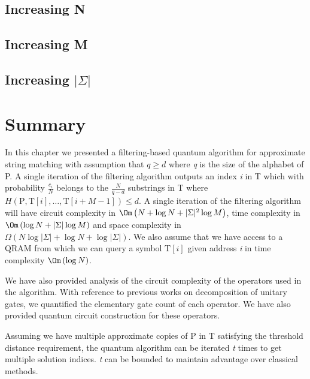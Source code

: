 \subsection{Increasing N}

\subsection{Increasing M}

\subsection{Increasing $\vert\Sigma\vert$}

\section{Summary}
In this chapter we presented a filtering-based quantum algorithm for approximate string matching with assumption that $q \geq d$ where \textit{q} is the size of the alphabet of P. A single iteration of the filtering algorithm outputs an index \textit{i} in T which with probability $\frac{c_i}{N}$ belongs to the $\frac{N}{q-d}$ substrings in T where $H\left( \mathrm{P}, \mathrm{T}[i],\ldots,\mathrm{T}[i+M-1] \right) \leq d$. A single iteration of the filtering algorithm will have circuit complexity in $\Om\left(N + \log N + \vert \Sigma \vert^2\log M \right)$, time complexity in $\Om\left( \log N + \vert \Sigma \vert\log M \right)$ and space complexity in $\Omega\left( N\log\vert \Sigma \vert + \log N + \log \vert \Sigma \vert \right)$. We also assume that we have access to a QRAM from which we can query a symbol $\mathrm{T}[i]$ given address \textit{i} in time complexity $\Om\left( \log N \right)$.

We have also provided analysis of the circuit complexity of the operators used in the algorithm. With reference to previous works on decomposition of unitary gates, we quantified the elementary gate count of each operator. We have also provided quantum circuit construction for these operators.

Assuming we have multiple approximate copies of P in T satisfying the threshold distance requirement, the quantum algorithm can be iterated \textit{t} times to get multiple solution indices. \textit{t} can be bounded to maintain advantage over classical methods.






